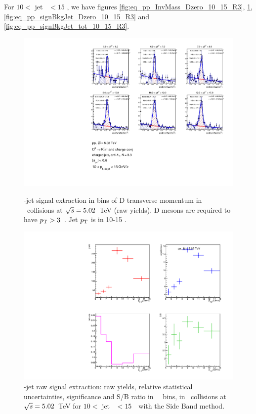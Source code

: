 For $10<$ jet \pt\ $<15$ \GeVc, we have figures \ref{fig:eq_pp_InvMass_Dzero_10_15_R3}, \ref{fig:eq_pp_signalParams_10_15_R3}, \ref{fig:eq_pp_signBkgJet_Dzero_10_15_R3} and \ref{fig:eq_pp_signBkgJet_tot_10_15_R3}.

\begin{figure}[bth]
\centering
\begin{minipage}{.65\textwidth}
  \centering
  \includegraphics[width=\linewidth]{pp_2sig/R3_jetbin_10_15/invMass_pTD5}
\caption{\Dzero-jet signal extraction in bins of D transverse momentum in \pp\ collisions at $\sqrt{s}=5.02$~TeV (raw yields). D mesons are required to have $p_{\rm T}>3$~\GeVc. Jet $p_{\rm T}$ is in 10-15 \GeVc.
}
\label{fig:eq_pp_InvMass_Dzero_10_15_R3}
\end{minipage}%
\begin{minipage}{.4\textwidth}
  \centering
  \includegraphics[width=\linewidth]{pp_2sig/R3_jetbin_10_15/signalParams_pTD5}
\caption{%
\Dzero-jet raw signal extraction: raw yields, relative statistical uncertainties, significance and S/B ratio in \Dzero\ \pt\ bins, in \pp\ collisions at $\sqrt{s}=5.02$~TeV for $10<$ jet \pt\ $<15$~\GeVc\ with the Side Band method.
}
\label{fig:eq_pp_signalParams_10_15_R3}
\end{minipage}
\end{figure}
